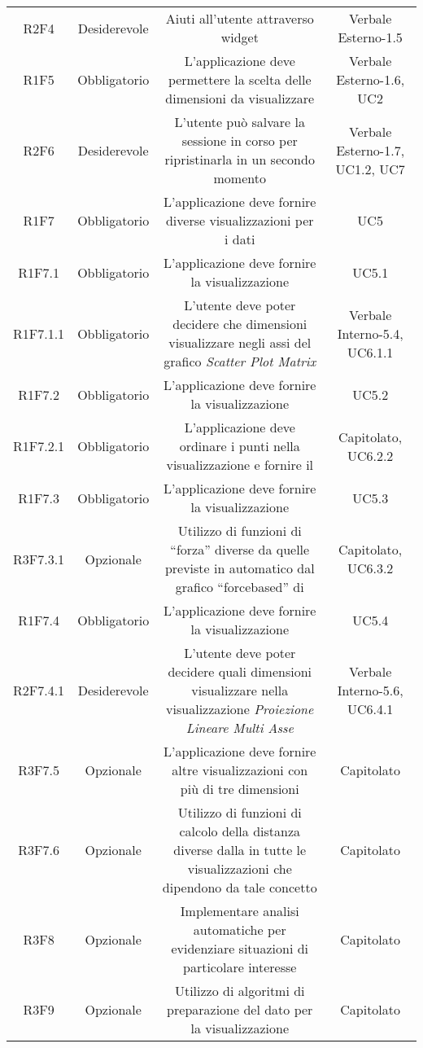 \begin{center}
\begin{longtable}{C{\colA} C{\colB} C{\colC} C{\colA}}
R2F4 & Desiderevole & Aiuti all'utente attraverso widget & Verbale Esterno-1.5 \\
R1F5 & Obbligatorio & L'applicazione deve permettere la scelta delle dimensioni da visualizzare & Verbale Esterno-1.6, UC2\\
R2F6 & Desiderevole & L'utente può salvare la sessione in corso per ripristinarla in un secondo momento & Verbale Esterno-1.7, UC1.2, UC7\\
R1F7 & Obbligatorio & L'applicazione deve fornire diverse visualizzazioni per i dati & UC5\\
R1F7.1 & Obbligatorio & L'applicazione deve fornire la visualizzazione  & UC5.1\\
R1F7.1.1 & Obbligatorio & L'utente deve poter decidere che dimensioni visualizzare negli assi del grafico \textit{Scatter Plot Matrix} & Verbale Interno-5.4, UC6.1.1\\
R1F7.2 & Obbligatorio & L'applicazione deve fornire la visualizzazione  & UC5.2\\
R1F7.2.1 & Obbligatorio & L'applicazione deve ordinare i punti nella visualizzazione  e fornire il  & Capitolato, UC6.2.2 \\
R1F7.3 & Obbligatorio & L'applicazione deve fornire la visualizzazione  & UC5.3\\
R3F7.3.1 & Opzionale & Utilizzo di funzioni di “forza” diverse da quelle previste in automatico dal grafico “forcebased” di  & Capitolato, UC6.3.2\\
R1F7.4 & Obbligatorio & L'applicazione deve fornire la visualizzazione  & UC5.4 \\
R2F7.4.1 & Desiderevole & L'utente deve poter decidere quali dimensioni visualizzare nella visualizzazione \textit{Proiezione Lineare Multi Asse} & Verbale Interno-5.6, UC6.4.1\\
R3F7.5 & Opzionale & L'applicazione deve fornire altre visualizzazioni con più di tre dimensioni & Capitolato\\
R3F7.6 & Opzionale & Utilizzo di funzioni di calcolo della distanza diverse dalla  in tutte le visualizzazioni che dipendono da tale concetto & Capitolato \\
R3F8 & Opzionale & Implementare analisi automatiche per evidenziare situazioni di particolare interesse & Capitolato\\
R3F9 & Opzionale & Utilizzo di algoritmi di preparazione del dato per la visualizzazione & Capitolato\\

\end{longtable}
\end{center}
